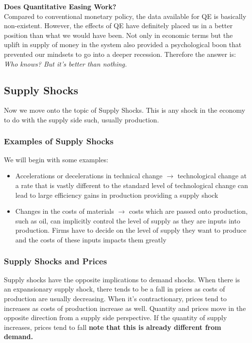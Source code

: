 \documentclass[12pt, letterpaper]{article}
\begin{document}
\textbf{Does Quantitative Easing Work?}\\
Compared to conventional monetary policy, the data available for QE is basically non-existent. However, the effects of QE have definitely placed us in a better position than what we would have been. Not only in economic terms but the uplift in supply of money in the system also provided a psychological boon that prevented our mindsets to go into a deeper recession. Therefore the answer is: \textit{Who knows? But it's better than nothing.}

\subsection{Supply Shocks}
Now we move onto the topic of Supply Shocks. This is any shock in the economy to do with the supply side such, usually production.

\subsubsection{Examples of Supply Shocks}
We will begin with some examples:
\begin{itemize}
	\item Accelerations or decelerations in technical change $\rightarrow$ technological change at a rate that is vastly different to the standard level of technological change can lead to large efficiency gains in production providing a supply shock
	\item Changes in the costs of materials $\rightarrow$ costs which are passed onto production, such as oil, can implicitly control the level of supply as they are inputs into production. Firms have to decide on the level of supply they want to produce and the costs of these inputs impacts them greatly
\end{itemize}

\subsubsection{Supply Shocks and Prices}
Supply shocks have the opposite implications to demand shocks. When there is an expansionary supply shock, there tends to be a fall in prices as costs of production are usually decreasing. When it's contractionary, prices tend to increases as costs of production increase as well. Quantity and prices move in the opposite direction from a supply side perspective. If the quantity of supply increases, prices tend to fall \textbf{note that this is already different from demand.}\\
\end{document}
